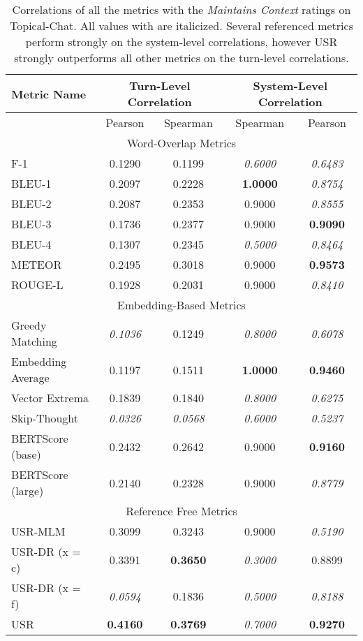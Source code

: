 \documentclass[11pt,a4paper]{article}
\begin{document}
\begin{table*}
    \centering
    \renewcommand*{\arraystretch}{1.2}
    \begin{tabular}{|l|c|c|c|c|}
    \hline
        \textbf{Metric Name} & \multicolumn{2}{|c|}{\textbf{Turn-Level Correlation}} & \multicolumn{2}{|c|}{\textbf{System-Level Correlation}}  \\ \hline
         & Pearson & Spearman & Spearman & Pearson \\ \hline
         \multicolumn{5}{|c|}{Word-Overlap Metrics} \\ \hline
F-1 & 0.1290 & 0.1199 & \textit{0.6000} & \textit{0.6483} \\
BLEU-1 & 0.2097 & 0.2228 & \textbf{1.0000} & \textit{0.8754} \\
BLEU-2 & 0.2087 & 0.2353 & 0.9000 & \textit{0.8555} \\
BLEU-3 & 0.1736 & 0.2377 & 0.9000 & \textbf{0.9090} \\
BLEU-4 & 0.1307 & 0.2345 & \textit{0.5000} & \textit{0.8464} \\
METEOR & 0.2495 & 0.3018 & 0.9000 & \textbf{0.9573} \\
ROUGE-L & 0.1928 & 0.2031 & 0.9000 & \textit{0.8410} \\   \hline
\multicolumn{5}{|c|}{Embedding-Based Metrics} \\ \hline
Greedy Matching & \textit{0.1036} & 0.1249 & \textit{0.8000} & \textit{0.6078} \\
Embedding Average & 0.1197 & 0.1511 & \textbf{1.0000} & \textbf{0.9460} \\
Vector Extrema & 0.1839 & 0.1840 & \textit{0.8000} & \textit{0.6275} \\
Skip-Thought & \textit{0.0326} & \textit{0.0568} & \textit{0.6000} & \textit{0.5237} \\
BERTScore (base) & 0.2432 & 0.2642 & 0.9000 & \textbf{0.9160} \\
BERTScore (large) & 0.2140 & 0.2328 & 0.9000 & \textit{0.8779} \\ \hline
\multicolumn{5}{|c|}{Reference Free Metrics} \\ \hline
USR-MLM & 0.3099 & 0.3243 & 0.9000 & \textit{0.5190} \\
USR-DR (x = c) & 0.3391 & \textbf{0.3650} & \textit{0.3000} & 0.8899 \\
USR-DR (x = f) & \textit{0.0594} & 0.1836 & \textit{0.5000} & \textit{0.8188} \\
USR & \textbf{0.4160} & \textbf{0.3769} & \textit{0.7000} & \textbf{0.9270} \\ \hline
    \end{tabular}
    \caption{Correlations of all the metrics with the \textit{Maintains Context} ratings on Topical-Chat. All values with  are italicized. Several referenced metrics perform strongly on the system-level correlations, however USR strongly outperforms all other metrics on the turn-level correlations.}
    
\end{table*}
\end{document}

